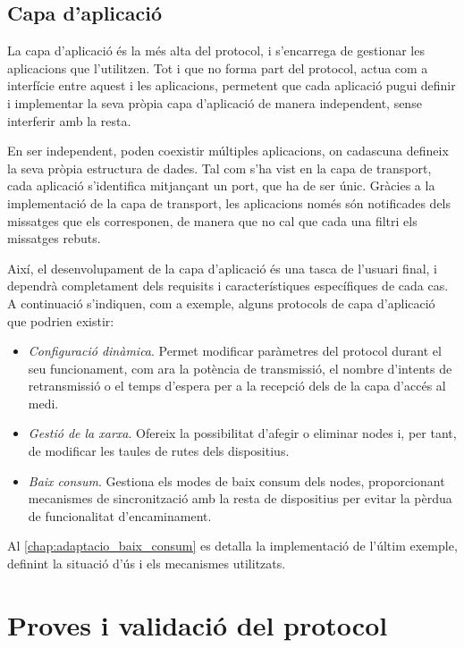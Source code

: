 \documentclass{tfgitic}[2024/07/01]
\begin{document}
{\subsection{Capa d’aplicació}
La capa d'aplicació és la més alta del protocol, i s'encarrega de gestionar les aplicacions que l'utilitzen. Tot i que no forma part del protocol, actua com a interfície entre aquest i les aplicacions, permetent que cada aplicació pugui definir i implementar la seva pròpia capa d'aplicació de manera independent, sense interferir amb la resta. 

En ser independent, poden coexistir múltiples aplicacions, on cadascuna defineix la seva pròpia estructura de dades. Tal com s'ha vist en la capa de transport, cada aplicació s'identifica mitjançant un port, que ha de ser únic. Gràcies a la implementació de la capa de transport, les aplicacions només són notificades dels missatges que els corresponen, de manera que no cal que cada una filtri els missatges rebuts.

Així, el desenvolupament de la capa d'aplicació és una tasca de l'usuari final, i dependrà completament dels requisits i característiques específiques de cada cas. A continuació s'indiquen, com a exemple, alguns protocols de capa d'aplicació que podrien existir:
\begin{itemize}
    \item \emph{Configuració dinàmica}. Permet modificar paràmetres del protocol durant el seu funcionament, com ara la potència de transmissió, el nombre d’intents de retransmissió o el temps d’espera per a la recepció dels  de la capa d’accés al medi.
    \item \emph{Gestió de la xarxa}. Ofereix la possibilitat d'afegir o eliminar nodes i, per tant, de modificar les taules de rutes dels dispositius.
    \item \emph{Baix consum}. Gestiona els modes de baix consum dels nodes, proporcionant mecanismes de sincronització amb la resta de dispositius per evitar la pèrdua de funcionalitat d’encaminament.
\end{itemize}

Al \autoref{chap:adaptacio_baix_consum} es detalla la implementació de l'últim exemple, definint la situació d'ús i els mecanismes utilitzats.

\section{Proves i validació del protocol}

}
\end{document}
